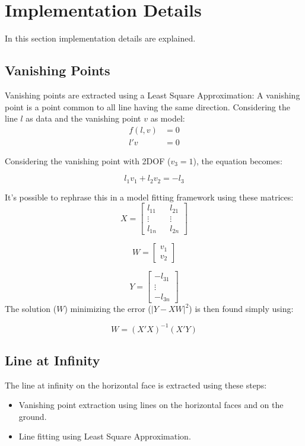 \documentclass[11pt, oneside]{article}   	%
\begin{document}
\section{Implementation Details}
In this section implementation details are explained.
\subsection{Vanishing Points}
Vanishing points are extracted using a Least Square Approximation:
A vanishing point is a point common to all line having the same direction. 
Considering the line $l$ as data and the vanishing point $v$ as model:
\begin{subequations}
\begin{align*}
f(l,v)&=0 \\
l'v &= 0
\end{align*}
\end{subequations}

Considering the vanishing point with 2DOF ($v_3=1$), the equation becomes:

$$
l_1 v_1 + l_2 v_2 = -l_3
$$

It's possible to rephrase this in a model fitting framework using these matrices:
$$
X = \begin{bmatrix}
l_{11} && l_{21} \\
\vdots  && \vdots\\
l_{1n} && l_{2n}
\end{bmatrix}
$$ 

$$
W = 
\begin{bmatrix}
v_1 \\
v_2
\end{bmatrix}
$$

$$
Y =
\begin{bmatrix}
-l_{31} \\
\vdots \\
-l_{3n}
\end{bmatrix}
$$
The solution ($W$) minimizing the error ($|Y-XW|^2$) is then found simply using:

$$
W = (X'X)^{-1}(X'Y)
$$

\subsection{Line at Infinity}
The line at infinity on the horizontal face is extracted using these steps:
\begin{itemize}
\item Vanishing point extraction using lines on the horizontal faces and on the ground. 
\item Line fitting using Least Square Approximation.
\end{itemize}
\end{document}
